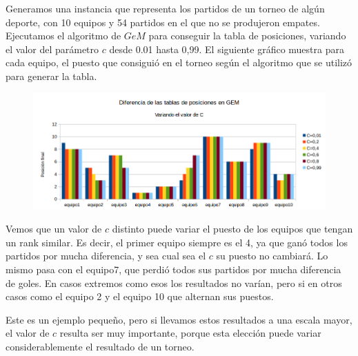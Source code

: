 Generamos una instancia que representa los partidos de un torneo de algún deporte, con 10 equipos y 54 partidos en el que no se produjeron empates. Ejecutamos el algoritmo de $GeM$ para conseguir la tabla de posiciones, variando el valor del parámetro $c$ desde 0.01 hasta 0,99. El siguiente gráfico muestra para cada equipo, el puesto que consiguió en el torneo según el algoritmo que se utilizó para generar la tabla.\\



\begin{figure}[H]
\centering
\includegraphics[width=0.7\linewidth]{imagenes/variacionDeTablaGEM.png}
\end{figure}


Vemos que un valor de $c$ distinto puede variar el puesto de los equipos que tengan un rank similar. Es decir, el primer equipo siempre es el 4, ya que ganó todos los partidos por mucha diferencia, y sea cual sea el $c$ su puesto no cambiará. Lo mismo pasa con el equipo7, que perdió todos sus partidos por mucha diferencia de goles. En casos extremos como esos los resultados no varían, pero si en otros casos como el equipo 2 y el equipo 10 que alternan sus puestos.

Este es un ejemplo pequeño, pero si llevamos estos resultados a una escala mayor, el valor de $c$ resulta ser muy importante, porque esta elección puede variar considerablemente el resultado de un torneo.
